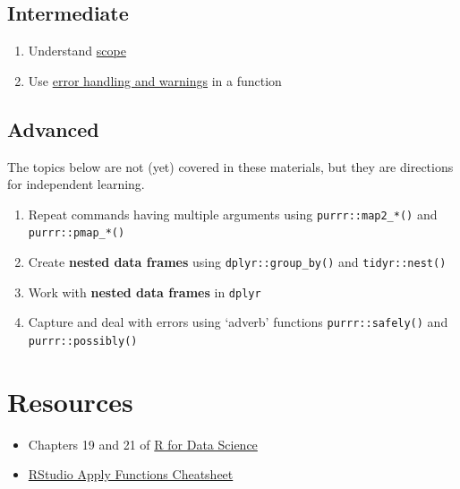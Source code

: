 \documentclass[
  oneside]{book}
\providecommand{\tightlist}{%
  \setlength{\itemsep}{0pt}\setlength{\parskip}{0pt}}
\begin{document}
\hypertarget{intermediate-4}{%
\subsection{Intermediate}\label{intermediate-4}}

\begin{enumerate}
\def\labelenumi{\arabic{enumi}.}
\setcounter{enumi}{4}
\tightlist
\item
  Understand \protect\hyperlink{scope}{scope}
\item
  Use \protect\hyperlink{warnings-errors}{error handling and warnings} in a function
\end{enumerate}

\hypertarget{advanced-1}{%
\subsection{Advanced}\label{advanced-1}}

The topics below are not (yet) covered in these materials, but they are directions for independent learning.

\begin{enumerate}
\def\labelenumi{\arabic{enumi}.}
\setcounter{enumi}{6}
\tightlist
\item
  Repeat commands having multiple arguments using \texttt{purrr::map2\_*()} and \texttt{purrr::pmap\_*()}
\item
  Create \textbf{nested data frames} using \texttt{dplyr::group\_by()} and \texttt{tidyr::nest()}
\item
  Work with \textbf{nested data frames} in \texttt{dplyr}
\item
  Capture and deal with errors using `adverb' functions \texttt{purrr::safely()} and \texttt{purrr::possibly()}
\end{enumerate}

\hypertarget{resources7}{%
\section{Resources}\label{resources7}}

\begin{itemize}
\tightlist
\item
  Chapters 19 and 21 of \href{http://r4ds.had.co.nz}{R for Data Science}
\item
  \href{https://github.com/rstudio/cheatsheets/raw/master/purrr.pdf}{RStudio Apply Functions Cheatsheet}
\end{itemize}
\end{document}
